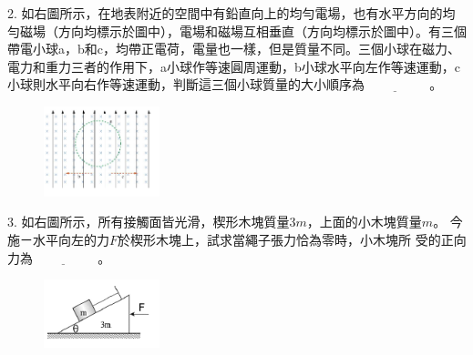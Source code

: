 \documentclass[cn,10pt,math=newtx]{elegantbook}
\begin{document}
\newpage


\begin{example}
   2. 如右圖所示，在地表附近的空間中有鉛直向上的均勻電場，也有水平方向的均勻磁場（方向均標示於圖中），電場和磁場互相垂直（方向均標示於圖中）。有三個帶電小球a，b和c，均帶正電荷，電量也一樣，但是質量不同。三個小球在磁力、電力和重力三者的作用下，a小球作等速圓周運動，b小球水平向左作等速運動，c小球則水平向右作等速運動，判斷這三個小球質量的大小順序為$\underline{\hspace{2cm}}$ 。\\
    \rightline{[中壢高中教甄109]}
\end{example}
\begin{solution}
    
\end{solution}
\begin{figure}[htbp]
    \flushright
    \includegraphics[width=0.3\textwidth]{image/109中壢2.png}
  \end{figure}
\newpage


\begin{example}
   3. 如右圖所示，所有接觸面皆光滑，楔形木塊質量3$m$，上面的小木塊質量$m$。
今施ㄧ水平向左的力$F$於楔形木塊上，試求當繩子張力恰為零時，小木塊所
受的正向力為$\underline{\hspace{2cm}}$ 。\\
    \rightline{[中壢高中教甄109]}
\end{example}
\begin{solution}
    
\end{solution}
\begin{figure}[htbp]
    \flushright
    \includegraphics[width=0.3\textwidth]{image/109中壢3.png}
  \end{figure}
\newpage
\end{document}
